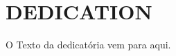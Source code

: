 
{\color{white}
\chapter{DEDICATION}
}


\vspace{3cm}

\begin{flushright}
\begin{textit}
O Texto da dedicatória vem para aqui.
\lipsum[1]
\end{textit}	
\end{flushright}
